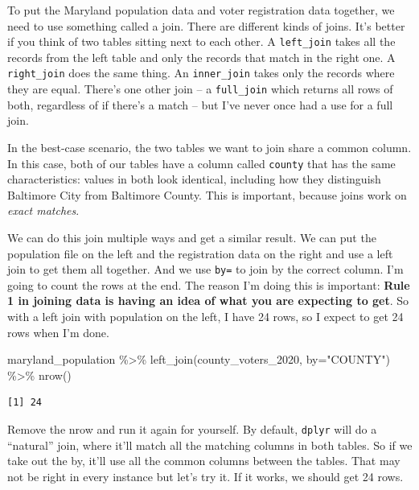 \documentclass[
  letterpaper,
  DIV=11,
  numbers=noendperiod]{scrreprt}
\newenvironment{Shaded}{\begin{snugshade}}{\end{snugshade}}
\newcommand{\AttributeTok}[1]{\textcolor[rgb]{0.40,0.45,0.13}{#1}}
\newcommand{\FunctionTok}[1]{\textcolor[rgb]{0.28,0.35,0.67}{#1}}
\newcommand{\NormalTok}[1]{\textcolor[rgb]{0.00,0.23,0.31}{#1}}
\newcommand{\SpecialCharTok}[1]{\textcolor[rgb]{0.37,0.37,0.37}{#1}}
\newcommand{\StringTok}[1]{\textcolor[rgb]{0.13,0.47,0.30}{#1}}
\begin{document}
To put the Maryland population data and voter registration data
together, we need to use something called a join. There are different
kinds of joins. It's better if you think of two tables sitting next to
each other. A \texttt{left\_join} takes all the records from the left
table and only the records that match in the right one. A
\texttt{right\_join} does the same thing. An \texttt{inner\_join} takes
only the records where they are equal. There's one other join -- a
\texttt{full\_join} which returns all rows of both, regardless of if
there's a match -- but I've never once had a use for a full join.

In the best-case scenario, the two tables we want to join share a common
column. In this case, both of our tables have a column called
\texttt{county} that has the same characteristics: values in both look
identical, including how they distinguish Baltimore City from Baltimore
County. This is important, because joins work on \emph{exact matches}.

We can do this join multiple ways and get a similar result. We can put
the population file on the left and the registration data on the right
and use a left join to get them all together. And we use \texttt{by=} to
join by the correct column. I'm going to count the rows at the end. The
reason I'm doing this is important: \textbf{Rule 1 in joining data is
having an idea of what you are expecting to get}. So with a left join
with population on the left, I have 24 rows, so I expect to get 24 rows
when I'm done.

\begin{Shaded}
\begin{Highlighting}[]
\NormalTok{maryland\_population }\SpecialCharTok{\%\textgreater{}\%} \FunctionTok{left\_join}\NormalTok{(county\_voters\_2020, }\AttributeTok{by=}\StringTok{"COUNTY"}\NormalTok{) }\SpecialCharTok{\%\textgreater{}\%} \FunctionTok{nrow}\NormalTok{()}
\end{Highlighting}
\end{Shaded}

\begin{verbatim}
[1] 24
\end{verbatim}

Remove the nrow and run it again for yourself. By default,
\texttt{dplyr} will do a ``natural'' join, where it'll match all the
matching columns in both tables. So if we take out the by, it'll use all
the common columns between the tables. That may not be right in every
instance but let's try it. If it works, we should get 24 rows.
\end{document}
